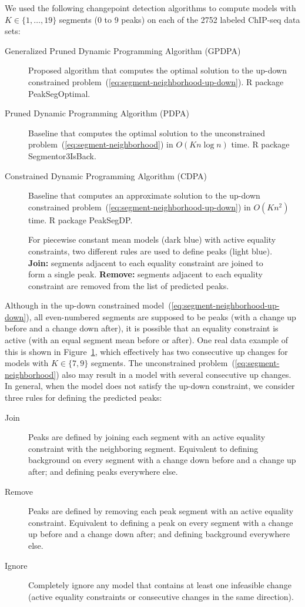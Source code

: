 \documentclass[twoside,11pt]{article}
\begin{document}
We used the following changepoint detection algorithms to compute
models with $K\in\{1,\dots,19\}$ segments (0 to 9 peaks) on each of
the 2752 labeled ChIP-seq data sets:
\begin{description}
\item[Generalized Pruned Dynamic Programming Algorithm (GPDPA)]
  Proposed algorithm that computes the optimal solution to the up-down
  constrained problem~(\ref{eq:segment-neighborhood-up-down}). R
  package PeakSegOptimal. 
\item[Pruned Dynamic Programming Algorithm (PDPA)] Baseline that
  computes the optimal solution to the unconstrained
  problem~(\ref{eq:segment-neighborhood}) in $O(Kn\log n)$
  time. R package Segmentor3IsBack.
\item[Constrained Dynamic Programming Algorithm (CDPA)] Baseline that
  computes an approximate solution to the up-down constrained
  problem~(\ref{eq:segment-neighborhood-up-down}) in $O(Kn^2)$
  time. R package PeakSegDP.
\end{description}
\begin{figure} 
  \centering
  
  \vspace{-1cm} 
  \caption{For piecewise constant mean models (dark blue) with
    active equality constraints, two different rules are used to define
    peaks (light blue). \textbf{Join:} segments adjacent to each equality
    constraint are joined to form a single peak. \textbf{Remove:}
    segments adjacent to each equality constraint are removed from the
    list of predicted peaks. }
  \label{fig:infeasible-error}
\end{figure}
Although in the up-down constrained
model~(\ref{eq:segment-neighborhood-up-down}), all even-numbered
segments are supposed to be peaks (with a change up before and a
change down after), it is possible that an equality constraint is
active (with an equal segment mean before or after). One real data
example of this is shown in Figure~\ref{fig:infeasible-error}, which
effectively has two consecutive up changes for models with
$K\in\{7,9\}$ segments. The unconstrained
problem~(\ref{eq:segment-neighborhood}) also may result in a model
with several consecutive up changes. In general, when the model does
not satisfy the up-down constraint, we consider three rules for
defining the predicted peaks:
\begin{description}
\item[Join] Peaks are defined by joining each segment with an
  active equality constraint with the neighboring segment. Equivalent
  to defining background on every segment with a change down before
  and a change up after; and defining peaks everywhere else.
\item[Remove] Peaks are defined by removing each peak segment with an
  active equality constraint. Equivalent to defining a peak on every
  segment with a change up before and a change down after; and
  defining background everywhere else.
\item[Ignore] Completely ignore any model that contains at least one
  infeasible change (active equality constraints or consecutive
  changes in the same direction).
\end{description}
\end{document}
